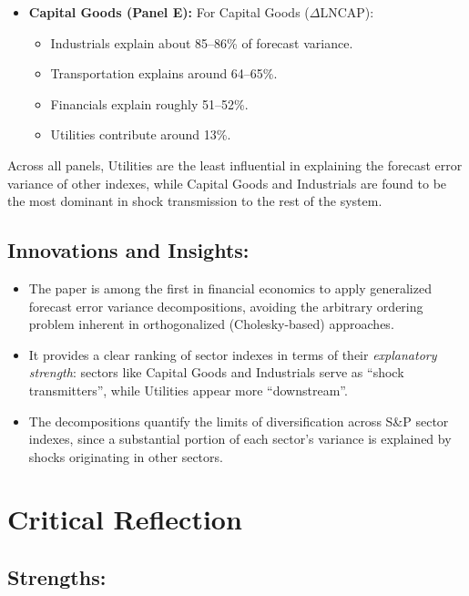 \documentclass{article}
\begin{document}
\begin{itemize}
    \item \textbf{Capital Goods (Panel E):}  
    For Capital Goods ($\Delta$LNCAP):
    \begin{itemize}
        \item Industrials explain about 85--86\% of forecast variance.
        \item Transportation explains around 64--65\%.
        \item Financials explain roughly 51--52\%.
        \item Utilities contribute around 13\%.
    \end{itemize}
\end{itemize}

\noindent Across all panels, Utilities are the least influential in explaining the forecast error variance of other indexes, while Capital Goods and Industrials are found to be the most dominant in shock transmission to the rest of the system.

\subsection{Innovations and Insights:}

\begin{itemize}
    \item The paper is among the first in financial economics to apply generalized forecast error variance decompositions, avoiding the arbitrary ordering problem inherent in orthogonalized (Cholesky-based) approaches.
    \item It provides a clear ranking of sector indexes in terms of their \textit{explanatory strength}: sectors like Capital Goods and Industrials serve as ``shock transmitters'', while Utilities appear more ``downstream''.
    \item The decompositions quantify the limits of diversification across S\&P sector indexes, since a substantial portion of each sector’s variance is explained by shocks originating in other sectors.
\end{itemize}

\hfill

\section{Critical Reflection}

\subsection{Strengths:}
\end{document}
